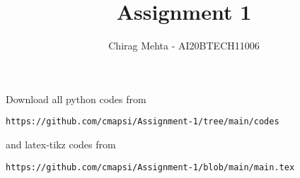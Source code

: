 \documentclass[journal,12pt,twocolumn]{IEEEtran}
\DeclareMathOperator*{\Res}{Res}
\begin{document}
\newcommand{\BEQA}{\begin{eqnarray}}
\newcommand{\EEQA}{\end{eqnarray}}
\newcommand{\define}{\stackrel{\triangle}{=}}

\raggedbottom
\setlength{\parindent}{0pt}
\providecommand{\mbf}{\mathbf}
\providecommand{\pr}[1]{\ensuremath{\Pr\left(#1\right)}}
\providecommand{\qfunc}[1]{\ensuremath{Q\left(#1\right)}}
\providecommand{\sbrak}[1]{\ensuremath{{}\left[#1\right]}}
\providecommand{\lsbrak}[1]{\ensuremath{{}\left[#1\right.}}
\providecommand{\rsbrak}[1]{\ensuremath{{}\left.#1\right]}}
\providecommand{\brak}[1]{\ensuremath{\left(#1\right)}}
\providecommand{\lbrak}[1]{\ensuremath{\left(#1\right.}}
\providecommand{\rbrak}[1]{\ensuremath{\left.#1\right)}}
\providecommand{\cbrak}[1]{\ensuremath{\left\{#1\right\}}}
\providecommand{\lcbrak}[1]{\ensuremath{\left\{#1\right.}}
\providecommand{\rcbrak}[1]{\ensuremath{\left.#1\right\}}}
\theoremstyle{remark}
\newtheorem{rem}{Remark}
\newcommand{\sgn}{\mathop{\mathrm{sgn}}}
\providecommand{\abs}[1]{\vert#1\vert}
\providecommand{\res}[1]{\Res\displaylimits_{#1}} 
\providecommand{\norm}[1]{\lVert#1\rVert}
\providecommand{\mtx}[1]{\mathbf{#1}}
\providecommand{\mean}[1]{E[ #1 ]}
\providecommand{\fourier}{\overset{\mathcal{F}}{ \rightleftharpoons}}
\providecommand{\system}{\overset{\mathcal{H}}{ \longleftrightarrow}}
\newcommand{\solution}{\noindent \textbf{Solution: }}
\newcommand{\cosec}{\,\text{cosec}\,}
\providecommand{\dec}[2]{\ensuremath{\overset{#1}{\underset{#2}{\gtrless}}}}
\newcommand{\myvec}[1]{\ensuremath{\begin{pmatrix}#1\end{pmatrix}}}
\newcommand{\mydet}[1]{\ensuremath{\begin{vmatrix}#1\end{vmatrix}}}
\makeatletter
{}
\makeatother
\let\StandardTheFigure\thefigure
\let\vec\mathbf
\renewcommand{\thefigure}{\theproblem}
\def\putbox#1#2#3{\makebox[0in][l]{\makebox[#1][l]{}\raisebox{\baselineskip}[0in][0in]{\raisebox{#2}[0in][0in]{#3}}}}
     \def\rightbox#1{\makebox[0in][r]{#1}}
     \def\centbox#1{\makebox[0in]{#1}}
     \def\topbox#1{\raisebox{-\baselineskip}[0in][0in]{#1}}
     \def\midbox#1{\raisebox{-0.5\baselineskip}[0in][0in]{#1}}
\vspace{3cm}
\title{Assignment 1}
\author{Chirag Mehta - AI20BTECH11006}
\maketitle
\newpage
\bigskip
\renewcommand{\thefigure}{\theenumi}
\renewcommand{\thetable}{\theenumi}
Download all python codes from 
\begin{lstlisting}
https://github.com/cmapsi/Assignment-1/tree/main/codes
\end{lstlisting}
and latex-tikz codes from 
\begin{lstlisting}
https://github.com/cmapsi/Assignment-1/blob/main/main.tex
\end{lstlisting}
\end{document}
